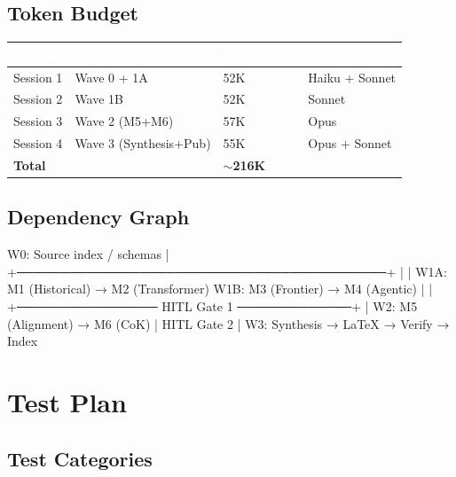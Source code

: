 \documentclass[11pt,letterpaper]{article}
\newcommand{\tableheader}[1]{\textbf{\sffamily\textcolor{white}{#1}}}
\begin{document}
\subsection{Token Budget}

\begin{center}
\begin{tabularx}{\textwidth}{L{4cm}C{2.5cm}C{2.5cm}C{2cm}}
\toprule
{}
\tableheader{Session} & \tableheader{Waves} & \tableheader{Est. Tokens} & \tableheader{Model} \\
\midrule
Session 1 & Wave 0 + 1A & 52K & Haiku + Sonnet \\
Session 2 & Wave 1B & 52K & Sonnet \\
Session 3 & Wave 2 (M5+M6) & 57K & Opus \\
Session 4 & Wave 3 (Synthesis+Pub) & 55K & Opus + Sonnet \\
\midrule
\textbf{Total} & & \textbf{$\sim$216K} & \\
\bottomrule
\end{tabularx}
\end{center}

\subsection{Dependency Graph}

\begin{asciibox}
   W0: Source index / schemas
        |
        +──────────────────────────────────────────+
        |                                          |
   W1A: M1 (Historical) → M2 (Transformer)   W1B: M3 (Frontier) → M4 (Agentic)
        |                                          |
        +──────────────── HITL Gate 1 ─────────────+
                                |
                  W2: M5 (Alignment) → M6 (CoK)
                                |
                         HITL Gate 2
                                |
                  W3: Synthesis → LaTeX → Verify → Index
\end{asciibox}

\section{Test Plan}

\subsection{Test Categories}
\end{document}
